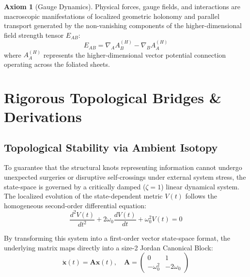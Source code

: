 \documentclass[12pt,letterpaper]{article}
\theoremstyle{definition}
\newtheorem{axiom}{Axiom}
\begin{document}
\begin{axiom}[Gauge Dynamics]
Physical forces, gauge fields, and interactions are macroscopic manifestations of localized geometric holonomy and parallel transport generated by the non-vanishing components of the higher-dimensional field strength tensor $E_{AB}$:
\begin{equation}
    E_{AB} = \nabla_{A}A_{B}^{(H)} - \nabla_{B}A_{A}^{(H)}
\end{equation}
where $A_A^{(H)}$ represents the higher-dimensional vector potential connection operating across the foliated sheets.
\end{axiom}

\section{Rigorous Topological Bridges \& Derivations}

\subsection{Topological Stability via Ambient Isotopy}
To guarantee that the structural knots representing information cannot undergo unexpected surgeries or disruptive self-crossings under external system stress, the state-space is governed by a critically damped ($\zeta = 1$) linear dynamical system. The localized evolution of the state-dependent metric $V(t)$ follows the homogeneous second-order differential equation:
\begin{equation}
    \frac{d^2V(t)}{dt^2} + 2\omega_0\frac{dV(t)}{dt} + \omega_0^2V(t) = 0
\end{equation}

By transforming this system into a first-order vector state-space format, the underlying matrix maps directly into a size-2 Jordan Canonical Block:
\begin{equation}
    \dot{\mathbf{x}}(t) = \mathbf{A}\mathbf{x}(t), \quad \mathbf{A} = \begin{pmatrix} 0 & 1 \\ -\omega_0^2 & -2\omega_0 \end{pmatrix}
\end{equation}
\end{document}
